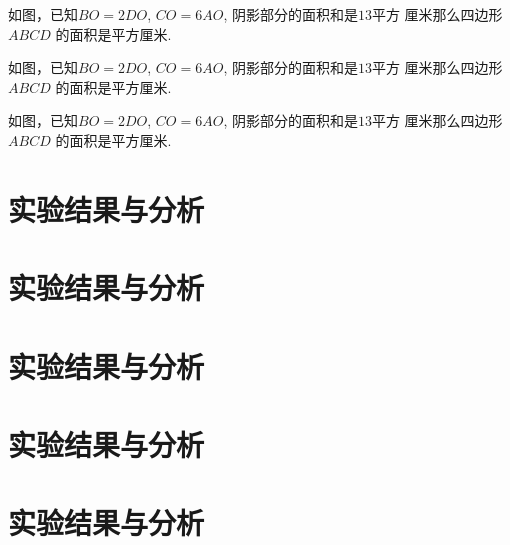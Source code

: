 \documentclass{USTBBook}
\begin{document}
\begin{question}
  如图，已知$BO=2DO$, $CO=6AO$, 阴影部分的面积和是$13$平方
  厘米那么四边形 $ABCD$ 的面积是\fillin[]平方厘米.
\end{question}

\begin{question}
  如图，已知$BO=2DO$, $CO=6AO$, 阴影部分的面积和是$13$平方
  厘米那么四边形 $ABCD$ 的面积是\fillin[]平方厘米.
\end{question}

\begin{question}
  如图，已知$BO=2DO$, $CO=6AO$, 阴影部分的面积和是$13$平方
  厘米那么四边形 $ABCD$ 的面积是\fillin[]平方厘米.
\end{question}

\chapter{实验结果与分析}
\zhlipsum[14]

\chapter{实验结果与分析}
\zhlipsum[14]

\chapter{实验结果与分析}
\zhlipsum[14]

\chapter{实验结果与分析}
\zhlipsum[14]

\chapter{实验结果与分析}
\zhlipsum[14]

\backmatter
\makeBackCover
\end{document}
